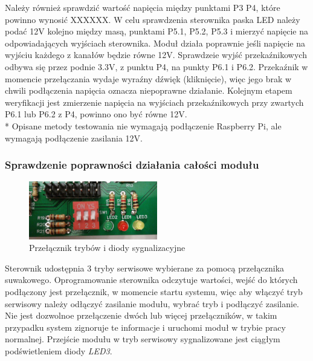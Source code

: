 \documentclass[12pt, eng, twoside, openany, final]{mgr}
\begin{document}
            Należy również sprawdzić wartość napięcia między punktami P3 P4, które powinno wynosić XXXXXX.
            W celu sprawdzenia sterownika paska LED należy podać 12V kolejno między masą, punktami P5.1, P5.2, P5.3 i mierzyć napięcie na odpowiadających wyjściach sterownika. Moduł działa poprawnie jeśli napięcie na wyjściu każdego z kanałów będzie równe 12V.
            Sprawdzeie wyjść przekaźnikowych odbywa się przez podnie 3.3V, z punktu P4, na punkty P6.1 i P6.2.
            Przekaźnik w momencie przełączania wydaje wyraźny dźwięk (kliknięcie), więc jego brak w chwili podłączenia napięcia oznacza niepoprawne działanie. Kolejnym etapem weryfikacji jest zmierzenie napięcia na wyjściach przekaźnikowych przy zwartych P6.1 lub P6.2 z P4, powinno ono być równe 12V.
            \\* Opisane metody testowania nie wymagają podłączenie Raspberry Pi, ale wymagają podłączenie zasilania 12V. 
            
            \subsubsection{Sprawdzenie poprawności działania całości modułu}
                \begin{figure}[H]
                \begin{center}
                    \includegraphics[width=0.5\textwidth]{dip_zoom.jpg}
                    \caption{Przełącznik trybów i diody sygnalizacyjne}
                \end{center}
                \end{figure}
            Sterownik udostępnia 3 tryby serwisowe wybierane za pomocą przełącznika suwakowego.
            Oprogramowanie sterownika odczytuje wartości, wejść do których podłączony jest przełącznik, w momencie startu systemu, więc aby włączyć tryb serwisowy należy odłączyć zasilanie modułu, wybrać tryb i podłączyć zasilanie. Nie jest dozwolnoe przełączenie dwóch lub więcej przełączników, w takim przypadku system zignoruje te informacje i uruchomi moduł w trybie pracy normalnej. Przejście modułu w tryb serwisowy sygnalizowane jest ciągłym podświetleniem diody \emph{LED3}.
            
\end{document}
